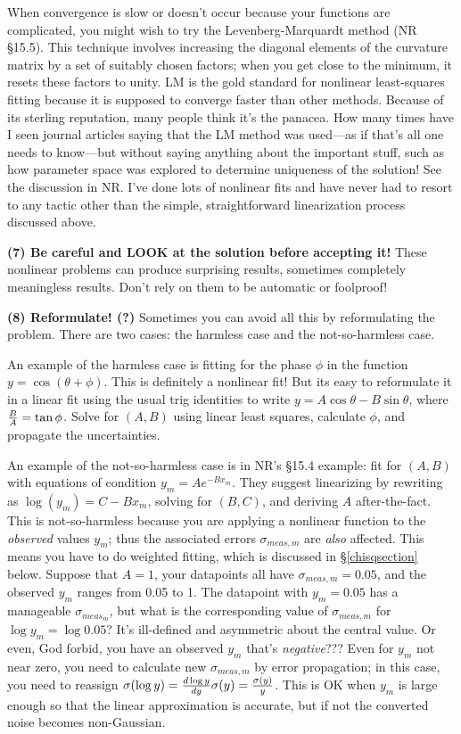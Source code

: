\documentclass[psfig,preprint]{aastex}
\begin{document}
	When convergence is slow or doesn't occur because your functions
are complicated, you might wish to try the Levenberg-Marquardt method
(NR \S 15.5).  This technique involves
increasing the diagonal elements of the curvature matrix by a set of
suitably chosen factors; when you get close to the minimum, it resets
these factors to unity.  LM is the gold standard for nonlinear
least-squares fitting because it is supposed to converge faster than
other methods.  Because of its sterling reputation, many people think
it's the panacea.  How many times have I seen journal articles saying
that the LM method was used---as if that's all one needs to know---but
without saying anything about the important stuff, such as how parameter
space was explored to determine uniqueness of the solution! See the
discussion in NR.  I've done lots of nonlinear fits and have never had
to resort to any tactic other than the simple, straightforward
linearization process discussed above. 

	{\bf (7) Be careful and LOOK at the solution before accepting
it!} These nonlinear problems can produce surprising results, sometimes
completely meaningless results. Don't rely on them to be automatic or
foolproof!

        {\bf (8) Reformulate! (?)} Sometimes you can avoid all this by
reformulating the problem. There are two cases: the harmless case and
the not-so-harmless case.

        An example of the harmless case is fitting for the phase $\phi$
in the function $y = \cos( \theta + \phi)$.  This is definitely a
nonlinear fit! But its easy to reformulate it in a linear fit using the
usual trig identities to write $y = A \cos \theta - B \sin \theta$,
where ${B \over A} = \tan \phi$.  Solve for $(A,B)$ using linear least
squares, calculate $\phi$, and propagate the uncertainties. 

        An example of the not-so-harmless case is in NR's \S 15.4
example: fit for $(A,B)$ with equations of condition $y_m = A
e^{-Bx_m}$.  They suggest linearizing by rewriting as $\log (y_m) = C -
Bx_m$, solving for $(B,C)$, and deriving $A$ after-the-fact.  This is
not-so-harmless because you are applying a nonlinear function to the
{\it observed} values $y_m$; thus the associated errors
$\sigma_{meas,m}$ are {\it also} affected.  This means you have to do
weighted fitting, which is discussed in \S \ref{chisqsection} below. 
Suppose that $A=1$, your datapoints all have $\sigma_{meas,m} = 0.05$,
and the observed $y_m$ ranges from 0.05 to 1.  The datapoint with $y_m =
0.05$ has a manageable $\sigma_{meas_m}$, but what is the corresponding
value of $\sigma_{meas,m}$ for $\log y_m = \log 0.05$? It's ill-defined
and asymmetric about the central value.  Or even, God forbid, you have
an observed $y_m$ that's {\it negative}??? Even for $y_m$ not near zero,
you need to calculate new $\sigma_{meas,m}$ by error propagation; in
this case, you need to reassign $\sigma(\log y) = {d \log y \over dy}
\sigma(y) = {\sigma(y) \over y}$.  This is OK when $y_m$ is large enough
so that the linear approximation is accurate, but if not the converted
noise becomes non-Gaussian. 
\end{document}
